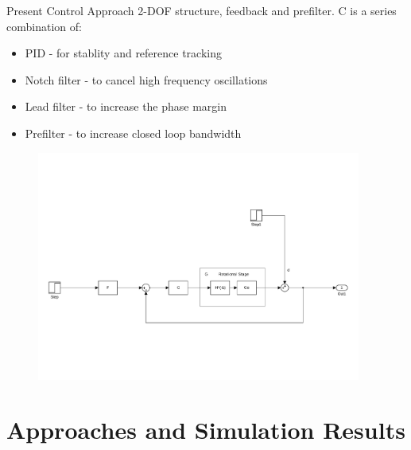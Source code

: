 \documentclass[10pt]{beamer}
\begin{document}
\begin{frame}{Present Control Approach}
  2-DOF structure, feedback and prefilter.
  C is a series combination of:
  \begin{itemize}
    \item  \alert{PID} - for stablity and reference tracking
    \item  \alert{Notch filter} - to cancel high frequency oscillations
    \item  \alert{Lead filter} - to increase the phase margin
    \item \alert{Prefilter} - to increase closed loop bandwidth
  \end{itemize}

  \begin{figure}[h!]
    \centering %
    \includegraphics[width=0.95\textwidth, trim=4cm 4cm 2.1cm 10cm, clip=true]{../fig/matlab/present_controller}
  \end{figure}
\end{frame}

\section{Approaches and Simulation Results}
\end{document}

